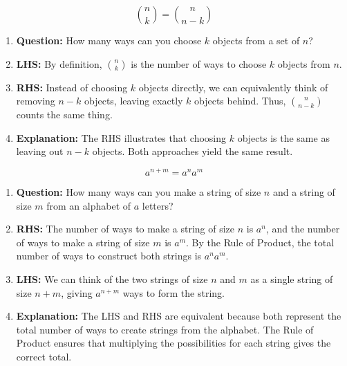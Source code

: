 \begin{example}
    \[
    \binom{n}{k} = \binom{n}{n-k}
    \]
    \begin{enumerate}
        \item \textbf{Question:} How many ways can you choose $k$ objects from a set of $n$?
        \item \textbf{LHS:} By definition, $\binom{n}{k}$ is the number of ways to choose $k$ objects from $n$.
        \item \textbf{RHS:} Instead of choosing $k$ objects directly, we can equivalently think of removing $n-k$ objects, leaving exactly $k$ objects behind. Thus, $\binom{n}{n-k}$ counts the same thing.
        \item \textbf{Explanation:} The RHS illustrates that choosing $k$ objects is the same as leaving out $n-k$ objects. Both approaches yield the same result.
    \end{enumerate}

    \[
    a^{n+m} = a^n a^m
    \]
    \begin{enumerate}
        \item \textbf{Question:} How many ways can you make a string of size $n$ and a string of size $m$ from an alphabet of $a$ letters?
        \item \textbf{RHS:} The number of ways to make a string of size $n$ is $a^n$, and the number of ways to make a string of size $m$ is $a^m$. By the Rule of Product, the total number of ways to construct both strings is $a^n a^m$.
        \item \textbf{LHS:} We can think of the two strings of size $n$ and $m$ as a single string of size $n+m$, giving $a^{n+m}$ ways to form the string.
        \item \textbf{Explanation:} The LHS and RHS are equivalent because both represent the total number of ways to create strings from the alphabet. The Rule of Product ensures that multiplying the possibilities for each string gives the correct total.
    \end{enumerate}


\end{example}
